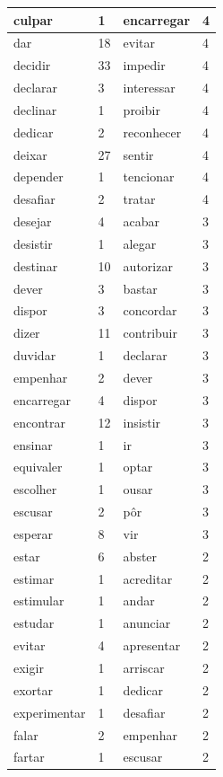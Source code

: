 \documentclass[output=paper,colorlinks,citecolor=brown]{langscibook}
\begin{document}
\begin{longtable}{ p{3cm} | p{1cm} | p{3cm} | p{1cm} }
			culpar & 1 & encarregar & 4\\\hline
			dar & 18 & evitar & 4\\\hline
			decidir & 33 & impedir & 4\\\hline
			declarar & 3 & interessar & 4\\\hline
			declinar & 1 & proibir & 4\\\hline
			dedicar & 2 & reconhecer & 4\\\hline
			deixar & 27 & sentir & 4\\\hline
			depender & 1 & tencionar & 4\\\hline
			desafiar & 2 & tratar & 4\\\hline
			desejar & 4 & acabar & 3\\\hline
			desistir & 1 & alegar & 3\\\hline
			destinar & 10 & autorizar & 3\\\hline
			dever & 3 & bastar & 3\\\hline
			dispor & 3 & concordar & 3\\\hline
			dizer & 11 & contribuir & 3\\\hline
			duvidar & 1 & declarar & 3\\\hline
			empenhar & 2 & dever & 3\\\hline
			encarregar & 4 & dispor & 3\\\hline
			encontrar & 12 & insistir & 3\\\hline
			ensinar & 1 & ir & 3\\\hline
			equivaler & 1 & optar & 3\\\hline
			escolher & 1 & ousar & 3\\\hline
			escusar & 2 & pôr & 3\\\hline
			esperar & 8 & vir & 3\\\hline
			estar & 6 & abster & 2\\\hline
			estimar & 1 & acreditar & 2\\\hline
			estimular & 1 & andar & 2\\\hline
			estudar & 1 & anunciar & 2\\\hline
			evitar & 4 & apresentar & 2\\\hline
			exigir & 1 & arriscar & 2\\\hline
			exortar & 1 & dedicar & 2\\\hline
			experimentar & 1 & desafiar & 2\\\hline
			falar & 2 & empenhar & 2\\\hline
			fartar & 1 & escusar & 2\\\hline

\end{longtable}
\end{document}
